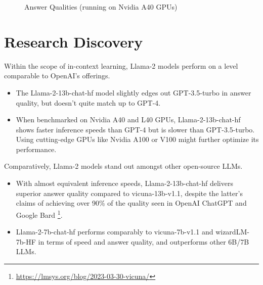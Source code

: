 \documentclass[conference]{IEEEtran}
\begin{document}
\begin{figure}
\caption{Answer Qualities (running on Nvidia A40 GPUs)}
\label{fig:6}       %
\end{figure}


\section{Research Discovery}
Within the scope of in-context learning, Llama-2 models perform on a level comparable to OpenAI's offerings. 
\begin{itemize}
    \item The Llama-2-13b-chat-hf model slightly edges out GPT-3.5-turbo in answer quality, but doesn't quite match up to GPT-4.
    \item When benchmarked on Nvidia A40 and L40 GPUs, Llama-2-13b-chat-hf shows faster inference speeds than GPT-4 but is slower than GPT-3.5-turbo. Using cutting-edge GPUs like Nvidia A100 or V100 might further optimize its performance. 
\end{itemize}

Comparatively, Llama-2 models stand out amongst other open-source LLMs.
\begin{itemize}
    \item With almost equivalent inference speeds, Llama-2-13b-chat-hf delivers superior answer quality compared to vicuna-13b-v1.1, despite the latter's claims of achieving over 90\% of the quality seen in OpenAI ChatGPT and Google Bard \footnote{\url{https://lmsys.org/blog/2023-03-30-vicuna/}}. 
    \item Llama-2-7b-chat-hf performs comparably to vicuna-7b-v1.1 and wizardLM-7b-HF in terms of speed and answer quality, and outperforms other 6B/7B LLMs.
\end{itemize}
\end{document}
